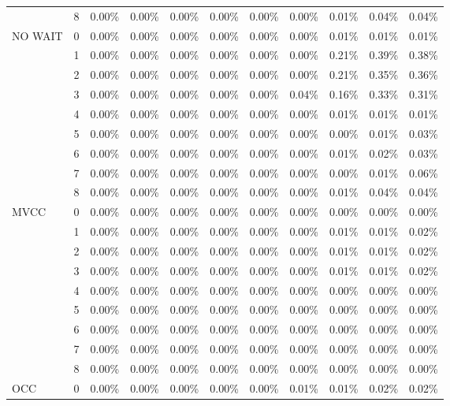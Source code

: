 \begin{tabular}{llrrrrrrrrr}
       & 8 & 0.00\% & 0.00\% & 0.00\% & 0.00\% & 0.00\% & 0.00\% & 0.01\% & 0.04\% & 0.04\% \\
NO WAIT & 0 & 0.00\% & 0.00\% & 0.00\% & 0.00\% & 0.00\% & 0.00\% & 0.01\% & 0.01\% & 0.01\% \\
       & 1 & 0.00\% & 0.00\% & 0.00\% & 0.00\% & 0.00\% & 0.00\% & 0.21\% & 0.39\% & 0.38\% \\
       & 2 & 0.00\% & 0.00\% & 0.00\% & 0.00\% & 0.00\% & 0.00\% & 0.21\% & 0.35\% & 0.36\% \\
       & 3 & 0.00\% & 0.00\% & 0.00\% & 0.00\% & 0.00\% & 0.04\% & 0.16\% & 0.33\% & 0.31\% \\
       & 4 & 0.00\% & 0.00\% & 0.00\% & 0.00\% & 0.00\% & 0.00\% & 0.01\% & 0.01\% & 0.01\% \\
       & 5 & 0.00\% & 0.00\% & 0.00\% & 0.00\% & 0.00\% & 0.00\% & 0.00\% & 0.01\% & 0.03\% \\
       & 6 & 0.00\% & 0.00\% & 0.00\% & 0.00\% & 0.00\% & 0.00\% & 0.01\% & 0.02\% & 0.03\% \\
       & 7 & 0.00\% & 0.00\% & 0.00\% & 0.00\% & 0.00\% & 0.00\% & 0.00\% & 0.01\% & 0.06\% \\
       & 8 & 0.00\% & 0.00\% & 0.00\% & 0.00\% & 0.00\% & 0.00\% & 0.01\% & 0.04\% & 0.04\% \\
MVCC & 0 & 0.00\% & 0.00\% & 0.00\% & 0.00\% & 0.00\% & 0.00\% & 0.00\% & 0.00\% & 0.00\% \\
       & 1 & 0.00\% & 0.00\% & 0.00\% & 0.00\% & 0.00\% & 0.00\% & 0.01\% & 0.01\% & 0.02\% \\
       & 2 & 0.00\% & 0.00\% & 0.00\% & 0.00\% & 0.00\% & 0.00\% & 0.01\% & 0.01\% & 0.02\% \\
       & 3 & 0.00\% & 0.00\% & 0.00\% & 0.00\% & 0.00\% & 0.00\% & 0.01\% & 0.01\% & 0.02\% \\
       & 4 & 0.00\% & 0.00\% & 0.00\% & 0.00\% & 0.00\% & 0.00\% & 0.00\% & 0.00\% & 0.00\% \\
       & 5 & 0.00\% & 0.00\% & 0.00\% & 0.00\% & 0.00\% & 0.00\% & 0.00\% & 0.00\% & 0.00\% \\
       & 6 & 0.00\% & 0.00\% & 0.00\% & 0.00\% & 0.00\% & 0.00\% & 0.00\% & 0.00\% & 0.00\% \\
       & 7 & 0.00\% & 0.00\% & 0.00\% & 0.00\% & 0.00\% & 0.00\% & 0.00\% & 0.00\% & 0.00\% \\
       & 8 & 0.00\% & 0.00\% & 0.00\% & 0.00\% & 0.00\% & 0.00\% & 0.00\% & 0.00\% & 0.00\% \\
OCC & 0 & 0.00\% & 0.00\% & 0.00\% & 0.00\% & 0.00\% & 0.01\% & 0.01\% & 0.02\% & 0.02\% \\

\end{tabular}
